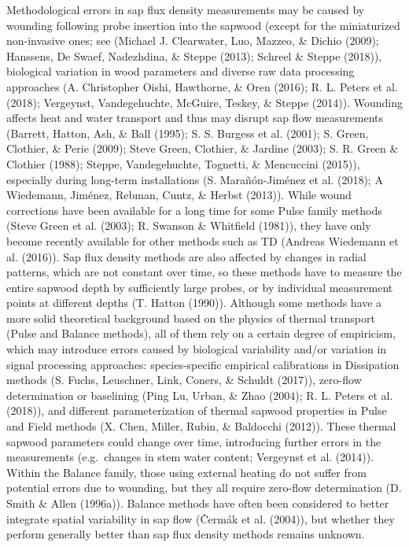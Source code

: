 \documentclass[11pt,twoside]{reedthesis}
\begin{document}
Methodological errors in sap flux density measurements may be caused by
wounding following probe insertion into the sapwood (except for the
miniaturized non-invasive ones; see (Michael J. Clearwater, Luo, Mazzeo,
\& Dichio (2009); Hanssens, De Swaef, Nadezhdina, \& Steppe (2013);
Schreel \& Steppe (2018)), biological variation in wood parameters and
diverse raw data processing approaches (A. Christopher Oishi, Hawthorne,
\& Oren (2016); R. L. Peters et al. (2018); Vergeynst, Vandegehuchte,
McGuire, Teskey, \& Steppe (2014)). Wounding affects heat and water
transport and thus may disrupt sap flow measurements (Barrett, Hatton,
Ash, \& Ball (1995); S. S. Burgess et al. (2001); S. Green, Clothier, \&
Perie (2009); Steve Green, Clothier, \& Jardine (2003); S. R. Green \&
Clothier (1988); Steppe, Vandegehuchte, Tognetti, \& Mencuccini (2015)),
especially during long-term installations (S. Marañón-Jiménez et al.
(2018); A Wiedemann, Jiménez, Rebman, Cuntz, \& Herbst (2013)). While
wound corrections have been available for a long time for some Pulse
family methods (Steve Green et al. (2003); R. Swanson \& Whitfield
(1981)), they have only become recently available for other methods such
as TD (Andreas Wiedemann et al. (2016)). Sap flux density methods are
also affected by changes in radial patterns, which are not constant over
time, so these methods have to measure the entire sapwood depth by
sufficiently large probes, or by individual measurement points at
different depths (T. Hatton (1990)). Although some methods have a more
solid theoretical background based on the physics of thermal transport
(Pulse and Balance methods), all of them rely on a certain degree of
empiricism, which may introduce errors caused by biological variability
and/or variation in signal processing approaches: species-specific
empirical calibrations in Dissipation methods (S. Fuchs, Leuschner,
Link, Coners, \& Schuldt (2017)), zero-flow determination or baselining
(Ping Lu, Urban, \& Zhao (2004); R. L. Peters et al. (2018)), and
different parameterization of thermal sapwood properties in Pulse and
Field methods (X. Chen, Miller, Rubin, \& Baldocchi (2012)). These
thermal sapwood parameters could change over time, introducing further
errors in the measurements (e.g.~changes in stem water content;
Vergeynst et al. (2014)). Within the Balance family, those using
external heating do not suffer from potential errors due to wounding,
but they all require zero-flow determination (D. Smith \& Allen
(1996a)). Balance methods have often been considered to better integrate
spatial variability in sap flow (Čermák et al. (2004)), but whether they
perform generally better than sap flux density methods remains
unknown.\par
\end{document}
